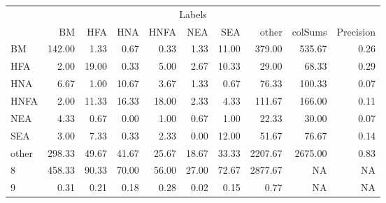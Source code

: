 \begin{table}
\centering\begingroup\fontsize{11}{13}\selectfont

\begin{tabular}{lrrrrrr>{}r|rr}
\toprule
\multicolumn{10}{c}{Labels} \\
\cmidrule(l{3pt}r{3pt}){1-10}
  & BM & HFA & HNA & HNFA & NEA & SEA & other & colSums & Precision\\
\midrule
BM & 142.00 & 1.33 & 0.67 & 0.33 & 1.33 & 11.00 & 379.00 & 535.67 & 0.26\\
HFA & 2.00 & 19.00 & 0.33 & 5.00 & 2.67 & 10.33 & 29.00 & 68.33 & 0.29\\
HNA & 6.67 & 1.00 & 10.67 & 3.67 & 1.33 & 0.67 & 76.33 & 100.33 & 0.07\\
HNFA & 2.00 & 11.33 & 16.33 & 18.00 & 2.33 & 4.33 & 111.67 & 166.00 & 0.11\\
NEA & 4.33 & 0.67 & 0.00 & 1.00 & 0.67 & 1.00 & 22.33 & 30.00 & 0.07\\
\addlinespace
SEA & 3.00 & 7.33 & 0.33 & 2.33 & 0.00 & 12.00 & 51.67 & 76.67 & 0.14\\
other & 298.33 & 49.67 & 41.67 & 25.67 & 18.67 & 33.33 & 2207.67 & 2675.00 & 0.83\\
8 & 458.33 & 90.33 & 70.00 & 56.00 & 27.00 & 72.67 & 2877.67 & NA & NA\\
9 & 0.31 & 0.21 & 0.18 & 0.28 & 0.02 & 0.15 & 0.77 & NA & NA\\
\bottomrule
\end{tabular}
\endgroup{}
\end{table}
